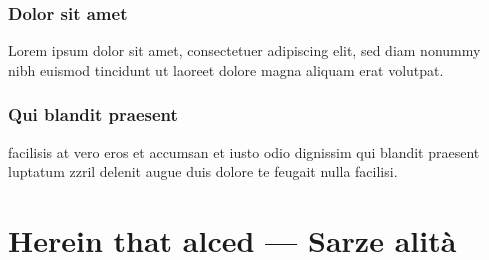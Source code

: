 \documentclass[]{../metanetpaper}
\begin{document}
	\subsubsection{Dolor sit amet}
	Lorem ipsum dolor sit amet, consectetuer adipiscing elit, sed diam nonummy nibh euismod tincidunt ut laoreet dolore magna aliquam erat volutpat.
	
	\subsubsection{Qui blandit praesent}
	facilisis at vero eros et accumsan et iusto odio dignissim qui blandit praesent luptatum zzril delenit augue duis dolore te feugait nulla facilisi.
	
	
	\clearpage
	\section{Herein that alced --- Sarze alità}
\end{document}
